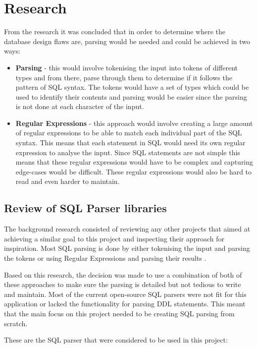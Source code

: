\section{Research}

From the research it was concluded that in order to determine where the database design flaws are, parsing would be needed and could be achieved in two ways:

\begin{itemize}
	\item \textbf{Parsing} - this would involve tokenising the input into tokens of different types and from there, parse through them to determine if it follows the pattern of SQL syntax. The tokens would have a set of types which could be used to identify their contents and parsing would be easier since the parsing is not done at each character of the input.
	
	\item \textbf{Regular Expressions} - this approach would involve creating a large amount of regular expressions to be able to match each individual part of the SQL syntax. This means that each statement in SQL would need its own regular expression to analyse the input. Since SQL statements are not simple this means that these regular expressions would have to be complex and capturing edge-cases would be difficult. These regular expressions would also be hard to read and even harder to maintain.
\end{itemize}

\subsection{Review of SQL Parser libraries}

The background research consisted of reviewing any other projects that aimed at achieving a similar goal to this project and inspecting their approach for inspiration. Most SQL parsing is done by either tokenising the input and parsing the tokens or using Regular Expressions and parsing their results \cite{Regex}. 

Based on this research, the decision was made to use a combination of both of these approaches to make sure the parsing is detailed but not tedious to write and maintain. Most of the current open-source SQL parsers were not fit for this application or lacked the functionality for parsing DDL statements. This meant that the main focus on this project needed to be creating SQL parsing from scratch.

These are the SQL parser that were considered to be used in this project:

